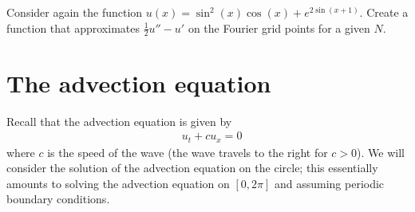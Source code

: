 \begin{problem}
Consider again the function $u(x) = \sin^2 (x) \cos(x) +e^{2\sin(x+1)}$.
Create a function that approximates $\frac{1}{2}u''-u'$ on the Fourier grid points for a given $N$.	
\end{problem}

% 
% 
% 



% 
% 
% 
% 


\section*{The advection equation}
Recall that the advection equation is given by
\begin{align}
&{ }u_t + cu_x = 0
\end{align}
where $c$ is the speed of the wave (the wave travels to the right for $c > 0$).
We will consider the solution of the advection equation on the circle; this essentially amounts to solving the advection equation on $[0,2\pi]$ and assuming periodic boundary conditions. 

